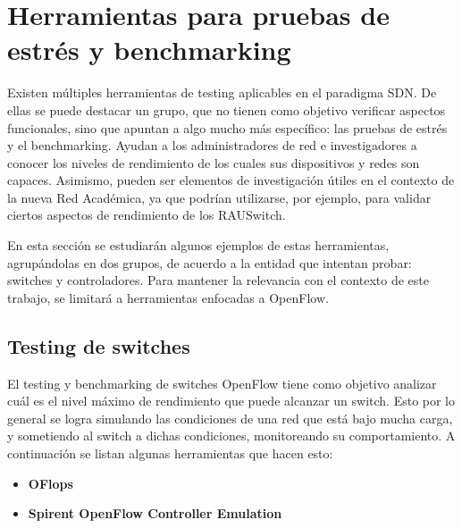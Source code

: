 \section{Herramientas para pruebas de estrés y benchmarking}
Existen múltiples herramientas de testing aplicables en el paradigma SDN. De ellas se puede destacar un grupo, que no tienen como objetivo verificar aspectos funcionales, sino que apuntan a algo mucho más específico: las pruebas de estrés y el benchmarking. Ayudan a los administradores de red e investigadores a conocer los niveles de rendimiento de los cuales sus dispositivos y redes son capaces. Asimismo, pueden ser elementos de investigación útiles en el contexto de la nueva Red Académica, ya que podrían utilizarse, por ejemplo, para validar ciertos aspectos de rendimiento de los RAUSwitch.

En esta sección se estudiarán algunos ejemplos de estas herramientas, agrupándolas en dos grupos, de acuerdo a la entidad que intentan probar: switches y controladores. Para mantener la relevancia con el contexto de este trabajo, se limitará a herramientas enfocadas a OpenFlow.

\subsection{Testing de switches}
El testing y benchmarking de switches OpenFlow tiene como objetivo analizar cuál es el nivel máximo de rendimiento que puede alcanzar un switch. Esto por lo general se logra simulando las condiciones de una red que está bajo mucha carga, y sometiendo al switch a dichas condiciones, monitoreando su comportamiento. A continuación se listan algunas herramientas que hacen esto:
\begin{itemize}
	\item \textbf{OFlops} \cite{oflops}
	\item \textbf{Spirent OpenFlow Controller Emulation} \cite{spirent-controller-emulation}
\end{itemize}

